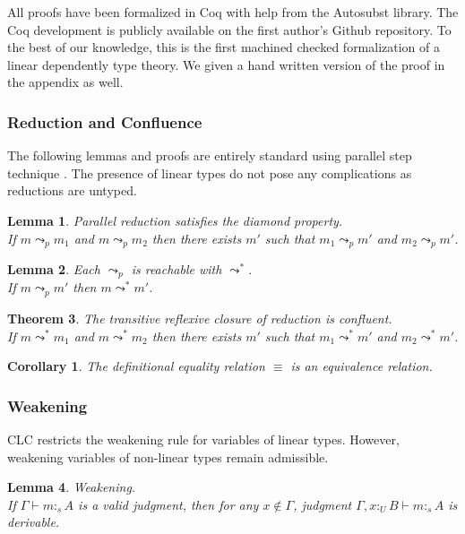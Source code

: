 \documentclass{article}
\newtheorem{theorem}{Theorem}[section]
\newtheorem{corollary}{Corollary}[theorem]
\newtheorem{lemma}[theorem]{Lemma}
\theoremstyle{definition}
\newcommand{\utype}{:_{\scriptscriptstyle U}}
\newcommand{\stype}[1]{:_#1}
\newcommand{\step}{\leadsto}
\newcommand{\pstep}{\leadsto}
\begin{document}
  All proofs have been formalized in Coq with help from the Autosubst \cite{autosubst} library. The Coq development is publicly available on the first author's Github repository. To the best of our knowledge, this is the first machined checked formalization of a linear dependently type theory. We given a hand written version of the proof in the appendix as well.

  \subsubsection{Reduction and Confluence}

  The following lemmas and proofs are entirely standard using parallel step technique \cite{takahashi}. The presence of linear types do not pose any complications as reductions are untyped.

  \begin{lemma} Parallel reduction satisfies the diamond property. \\
    If $m \pstep_p m_1$ and $m \pstep_p m_2$ then there exists $m'$ such that $m_1 \pstep_p m'$ and $m_2 \pstep_p m'$.
  \end{lemma}

  \begin{lemma} Each $\pstep_p$ is reachable with $\step^*$. \\
    If $m \pstep_p m'$ then $m \step^* m'$.
  \end{lemma}

  \begin{theorem} The transitive reflexive closure of reduction is confluent. \\ 
    If $m \step^* m_1$ and $m \step^* m_2$ then there exists $m'$ such that $m_1 \pstep^* m'$ and $m_2 \pstep^* m'$.
  \end{theorem}

  \begin{corollary}
    The definitional equality relation $\equiv$ is an equivalence relation.
  \end{corollary}

  \subsubsection{Weakening} \label{subst}
  CLC restricts the weakening rule for variables of linear types. However, weakening variables of non-linear types remain admissible.

  \begin{lemma} Weakening. \\
    If $\Gamma \vdash m \stype{s} A$ is a valid judgment, then for any $x \notin \Gamma$, judgment $\Gamma, x \utype B \vdash m \stype{s} A$ is derivable.
  \end{lemma}
\end{document}
